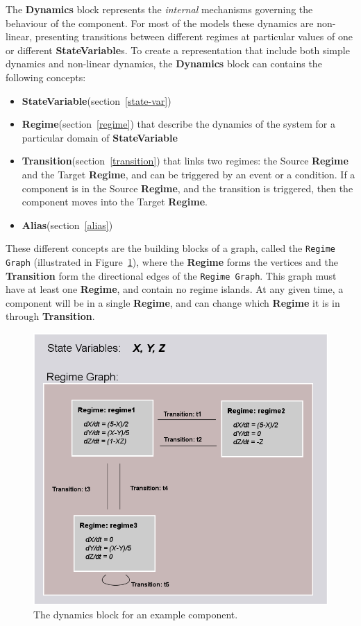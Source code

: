 \documentclass{article}
\newcommand{\Dynamics}{{\bf{Dynamics}}\xspace}
\newcommand{\StateVariable}{{\bf{StateVariable}}\xspace}
\newcommand{\StateVariables}{{\bf{StateVariable}}s\xspace}
\newcommand{\Alias}{{\bf{Alias}}\xspace}
\newcommand{\Regime}{{\bf{Regime}}\xspace}
\newcommand{\Transition}{{\bf{Transition}}\xspace}
\begin{document}
The \Dynamics block represents the \emph{internal} mechanisms
governing the behaviour of the component.  For most of the models
these dynamics are non-linear, presenting transitions between
different regimes at particular values of one or different \StateVariables.
To create a representation that include both simple
dynamics and non-linear dynamics, the \Dynamics block can contains the
following concepts:

\begin{itemize}
\item \StateVariable (section~\ref{state-var})
\item \Regime (section~\ref{regime}) that describe the dynamics of the
system for a particular domain of \StateVariable
\item \Transition (section~\ref{transition}) that links two
regimes: the Source \Regime and the Target \Regime, and can be triggered by
an event or a condition. If a component is in the Source \Regime, and the
transition is triggered, then the component moves into the Target \Regime.
\item \Alias (section~\ref{alias})
\end{itemize}


These different concepts are the building blocks of a graph, called
the {\tt Regime Graph} (illustrated in Figure~\ref{SimpleRegimeGraph}),
where the \Regime forms the vertices and the \Transition form the
directional edges of the {\tt Regime Graph}. This graph must have at
least one \Regime, and contain no regime islands. At any given time,
a component will be in a single \Regime, and can change which \Regime
it is in through \Transition.

\begin{figure}[htb!]
\center
\includegraphics[width=14cm]{images/SimpleRegimeGraph.png}
\protect\caption{The dynamics block for an example component.}
\label{SimpleRegimeGraph}
\end{figure}
\end{document}
